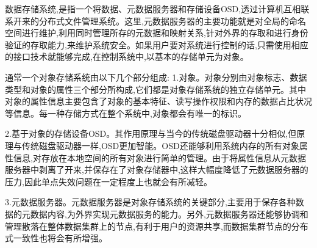 







数据存储系统,是指一个将数据、元数据服务器和存储设备OSD,透过计算机互相联系开来的分布式文件管理系统。这里,元数据服务器的主要功能就是对全局的命名空间进行维护,利用同时管理所存的元数据和映射关系,针对外界的存取和进行身份验证的存取能力,来维护系统安全。如果用户要对系统进行控制的话,只需使用相应的接口技术就能够完成,在控制系统中,以基本的存储单元为对象。

通常一个对象存储系统由以下几个部分组成:
1.对象。对象分别由对象标志、数据类型和对象的属性三个部分所构成,它们都是对象存储系统的独立存储单元。其中对象的属性信息主要包含了对象的基本特征、读写操作权限和内存的数据占比状况等信息。每一种存储方式在整个系统中,对象都会有唯一的标识。

2.基于对象的存储设备OSD。其作用原理与当今的传统磁盘驱动器十分相似,但原理与传统磁盘驱动器一样,OSD更加智能。OSD还能够利用系统内存的所有对象属性信息,对存放在本地空间的所有对象进行简单的管理。由于将属性信息从元数据服务器中剥离了开来,并保存在了对象存储器中,这样大幅度降低了元数据服务器的压力,因此单点失效问题在一定程度上也就会有所减轻。

3.元数据服务器。元数据服务器是对象存储系统的关键部分,主要用于保存各种数据的元数据内容,为外界实现元数据服务的能力。另外,元数据服务器还能够协调和管理散落在整体数据集群上的节点,有利于用户的资源共享,而数据集群节点的分布式一致性也将会有所增强。

